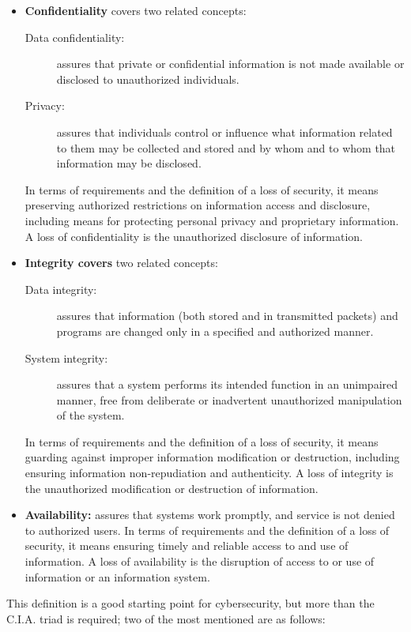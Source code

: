 \begin{itemize}
  \item \textbf{Confidentiality} covers two related concepts:
        \begin{description}
          \item [Data confidentiality:] assures that private or confidential information is not made available or disclosed to unauthorized individuals.
          \item [Privacy:] assures that individuals control or influence what information related to them may be collected and stored and by whom and to whom that information may be disclosed.
        \end{description}
        In terms of requirements and the definition of a loss of security, it means preserving authorized restrictions on information access and disclosure, including means for protecting personal privacy and proprietary information. A loss of confidentiality is the unauthorized disclosure of information.

  \item \textbf{Integrity covers} two related concepts:
        \begin{description}
          \item [Data integrity:] assures that information (both stored and in transmitted packets) and programs are changed only in a specified and authorized manner.
          \item [System integrity:] assures that a system performs its intended function in an unimpaired manner, free from deliberate or inadvertent unauthorized manipulation of the system.
        \end{description}
        In terms of requirements and the definition of a loss of security, it means guarding against improper information modification or destruction, including ensuring information non-repudiation and authenticity. A loss of integrity is the unauthorized modification or destruction of information.

  \item \textbf{Availability:} assures that systems work promptly, and service is not denied to authorized users. In terms of requirements and the definition of a loss of security, it means ensuring timely and reliable access to and use of information. A loss of availability is the disruption of access to or use of information or an information system.
\end{itemize}

This definition is a good starting point for cybersecurity, but more than the C.I.A. triad is required; two of the most mentioned are as follows:


